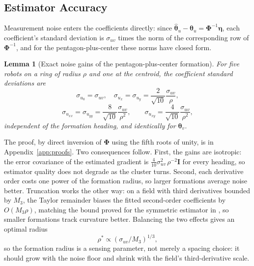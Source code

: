 \documentclass[lettersize,journal]{IEEEtran}
\newtheorem{lemma}{Lemma}
\begin{document}
\subsection{Estimator Accuracy}
\label{sec:sensitivity}

Measurement noise enters the coefficients directly: since
$\hat{\boldsymbol{\theta}}_u - \boldsymbol{\theta}_u =
\boldsymbol{\Phi}^{-1}\boldsymbol{\eta}$, each coefficient's standard
deviation is $\sigma_{uv}$ times the norm of the corresponding row of
$\boldsymbol{\Phi}^{-1}$, and for the pentagon-plus-center these norms
have closed form.

\begin{lemma}[Exact noise gains of the pentagon-plus-center formation]
\label{lem:gains}
For five robots on a ring of radius $\rho$ and one at the centroid, the
coefficient standard deviations are
\begin{equation}
    \sigma_{u_0} = \sigma_{uv}, \quad
    \sigma_{u_x} = \sigma_{u_y} = \frac{2}{\sqrt{10}}\frac{\sigma_{uv}}{\rho},
    \label{eq:gain_grad}
\end{equation}
\begin{equation}
    \sigma_{u_{xx}} = \sigma_{u_{yy}} = \frac{8}{\sqrt{10}}
    \frac{\sigma_{uv}}{\rho^2},
    \qquad
    \sigma_{u_{xy}} = \frac{4}{\sqrt{10}}\frac{\sigma_{uv}}{\rho^2},
    \label{eq:gain_hess}
\end{equation}
independent of the formation heading, and identically for
$\boldsymbol{\theta}_v$.
\end{lemma}

The proof, by direct inversion of $\boldsymbol{\Phi}$ using the fifth
roots of unity, is in Appendix~\ref{app:proofs}. Two consequences
follow. First, the gains are isotropic: the error covariance of the
estimated gradient is $\tfrac{4}{10}\sigma_{uv}^2\,\rho^{-2}\mathbf{I}$
for every heading, so estimator quality does not degrade as the cluster
turns. Second, each derivative order costs one power of the formation
radius, so larger formations average noise better. Truncation works the
other way: on a field with third derivatives bounded by $M_3$, the
Taylor remainder biases the fitted second-order coefficients by $O(M_3
\rho)$, matching the bound proved for the symmetric estimator in
\cite{15}, so smaller formations track curvature better. Balancing the
two effects gives an optimal radius
\begin{equation}
    \rho^* \propto \left(\sigma_{uv}/M_3\right)^{1/3},
    \label{eq:rho_star}
\end{equation}
so the formation radius is a sensing parameter, not merely a spacing
choice: it should grow with the noise floor and shrink with the field's
third-derivative scale.
\end{document}
